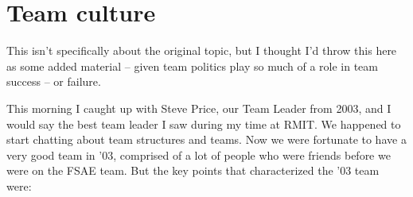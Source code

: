 \documentclass[10pt, a4paper, article, oneside, twocolumn, final]{memoir}
\begin{document}
\chapter*{Team culture}

This isn't specifically about the original topic, but I thought I'd throw this here as some added material -- given team politics play so much of a role in team success -- or failure. 

This morning I caught up with Steve Price, our Team Leader from 2003, and I would say the best team leader I saw during my time at RMIT. We happened to start chatting about team structures and teams. Now we were fortunate to have a very good team in ’03, comprised of a lot of people who were friends before we were on the FSAE team. But the key points that characterized the ’03 team were: 
\end{document}

